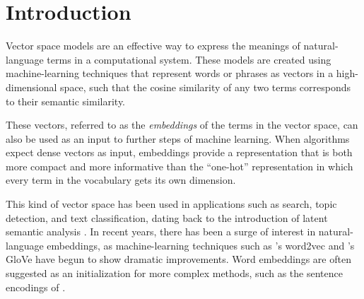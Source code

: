 \documentclass[11pt,letterpaper]{article}
\title{\thetitle}
\author{Robert Speer\\
    Luminoso Technologies, Inc.\\
    675 Massachusetts Ave.\\
    Cambridge, MA 02139\\
    \texttt{rspeer@luminoso.com}
\And
    Joshua Chin\\
    Union College\\
    807 Union St.\\
    Schenectady, NY 12308\\
    \texttt{joshuarchin@gmail.com}
}
\date{}
\begin{document}
\maketitle
\begin{abstract}

A currently successful approach to computational semantics is to represent
words as embeddings in a machine-learned vector space. We
present an ensemble method that combines embeddings produced by GloVe
\cite{pennington2014glove} and word2vec \cite{mikolov2013word2vec} with
structured knowledge from the semantic networks ConceptNet
\cite{speer2012conceptnet} and PPDB \cite{ganitkevitch2013ppdb}, merging their
information into a common representation with a large, multilingual vocabulary.
The embeddings it produces achieve state-of-the-art performance on many word-similarity evaluations. Its score of $\rho = \scoreRW{}$ on an evaluation of
rare words \cite{luong2013rw} is 16\% higher than the previous best known
system.

\end{abstract}

\section{Introduction}

Vector space models are an effective way to express the meanings of
natural-language terms in a computational system. These models are created
using machine-learning techniques that represent words or phrases as
vectors in a high-dimensional space, such that the cosine similarity of any two
terms corresponds to their semantic similarity.

These vectors, referred to as
the {\em embeddings} of the terms in the vector space, can also be used as an input to further steps of
machine learning. When algorithms expect dense vectors as input, embeddings
provide a representation that is both more compact and more informative than the
``one-hot'' representation in which every term in the vocabulary gets its own
dimension.

This kind of vector space has been used in applications such as search, topic
detection, and text classification, dating back to the introduction of latent
semantic analysis \cite{deerwester1990indexing}.  In recent years, there has
been a surge of interest in natural-language embeddings, as machine-learning
techniques such as 's word2vec and
's GloVe have begun to show dramatic improvements.
Word embeddings are often suggested as an initialization for more complex
methods, such as the sentence encodings of .
\end{document}
